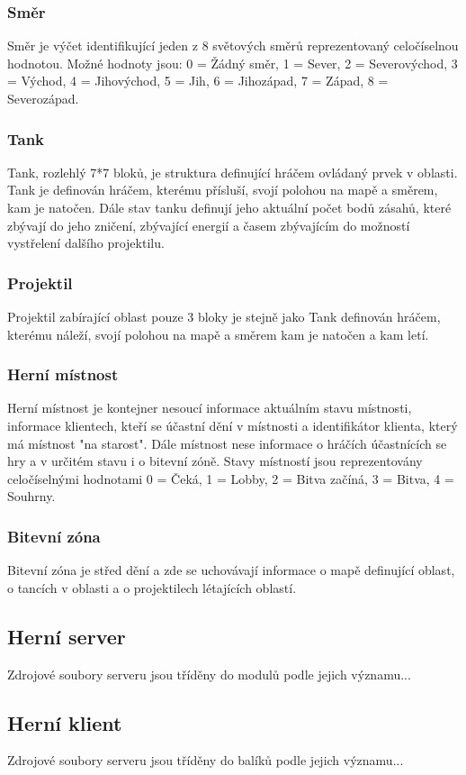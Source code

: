 \documentclass[12pt,a4paper]{article}
\begin{document}
\subsubsection*{Směr}
Směr je výčet identifikující jeden z 8 světových směrů reprezentovaný celočíselnou hodnotou. Možné hodnoty jsou: 0 = Žádný směr, 1 = Sever, 2 = Severovýchod, 3 = Východ, 4 = Jihovýchod, 5 = Jih, 6 = Jihozápad, 7 = Západ, 8 = Severozápad.
\subsubsection*{Tank}
Tank, rozlehlý 7*7 bloků, je struktura definující hráčem ovládaný prvek v oblasti. Tank je definován hráčem, kterému přísluší, svojí polohou na mapě a směrem, kam je natočen. Dále stav tanku definují jeho aktuální počet bodů zásahů, které zbývají do jeho zničení, zbývající energií a časem zbývajícím do možností vystřelení dalšího projektilu.
\subsubsection*{Projektil}
Projektil zabírající oblast pouze 3 bloky je stejně jako Tank definován hráčem, kterému náleží, svojí polohou na mapě a směrem kam je natočen a kam letí.
\subsubsection{Herní místnost}
Herní místnost je kontejner nesoucí informace aktuálním stavu místnosti, informace klientech, kteří se účastní dění v místnosti a identifikátor klienta, který má místnost "na starost". Dále místnost nese informace o hráčích účastnících se hry a v určitém stavu i o bitevní zóně.
Stavy místností jsou reprezentovány celočíselnými hodnotami 0 = Čeká, 1 = Lobby, 2 = Bitva začíná, 3 = Bitva, 4 = Souhrny.
\subsubsection*{Bitevní zóna}
Bitevní zóna je střed dění a zde se uchovávají informace o mapě definující oblast, o tancích v oblasti a o projektilech létajících oblastí.


\subsection{Herní server}
Zdrojové soubory serveru jsou tříděny do modulů podle jejich významu...
\subsection{Herní klient}
Zdrojové soubory serveru jsou tříděny do balíků podle jejich významu...
\end{document}
